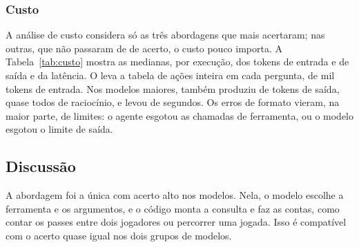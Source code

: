 \vspace{2mm}
\noindent\begin{minipage}{\columnwidth}
\centering
{}
\label{fig:modelos}
\end{minipage}\par\smallskip

\subsubsection{Custo}

A análise de custo considera só as três abordagens que mais acertaram; nas outras, que não passaram de
\accMaxOthers{} de acerto, o custo pouco importa. A Tabela~\ref{tab:custo} mostra as medianas, por execução, dos
tokens de entrada e de saída e da latência. O \armEventsInPrompt{} leva a tabela de ações inteira em cada pergunta,
de \inRangeEventsInPrompt{} mil tokens de entrada. Nos modelos maiores, também produziu de
\outRangeHighEventsInPrompt{} tokens de saída, quase todos de raciocínio, e levou de \latRangeHighEventsInPrompt{}
segundos. Os erros de formato vieram, na maior parte, de limites: o agente esgotou as chamadas de ferramenta, ou o
modelo esgotou o limite de saída.

\vspace{2mm}
\noindent\begin{minipage}{\columnwidth}
\centering\footnotesize\renewcommand{\arraystretch}{1.15}\setlength{\tabcolsep}{5pt}
\label{tab:custo}
\end{minipage}\par\smallskip

\subsection{Discussão}\label{sec:discussao}

A abordagem \armGraphTools{} foi a única com acerto alto nos \nModels{} modelos. Nela, o modelo escolhe a
ferramenta e os argumentos, e o código monta a consulta e faz as contas, como contar os passes entre dois jogadores
ou percorrer uma jogada. Isso é compatível com o acerto quase igual nos dois grupos de modelos.


